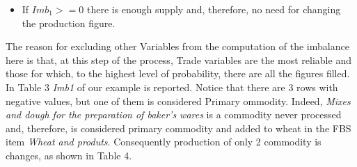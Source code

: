 \documentclass[]{article}
\providecommand{\tightlist}{%
  \setlength{\itemsep}{0pt}\setlength{\parskip}{0pt}}
\begin{document}
\begin{itemize}
\tightlist
\item
  If \(Imb_{1} >= 0\) there is enough supply and, therefore, no need for
  changing the production figure.
\end{itemize}

The reason for excluding other Variables from the computation of the
imbalance here is that, at this step of the process, Trade variables are
the most reliable and those for which, to the highest level of
probability, there are all the figures filled. In Table 3 \emph{Imb1} of
our example is reported. Notice that there are 3 rows with negative
values, but one of them is considered Primary ommodity. Indeed,
\emph{Mixes and dough for the preparation of baker's wares} is a
commodity never processed and, therefore, is considered primary
commodity and added to wheat in the FBS item \emph{Wheat and produts}.
Consequently production of only 2 commodity is changes, as shown in
Table 4.
\end{document}
